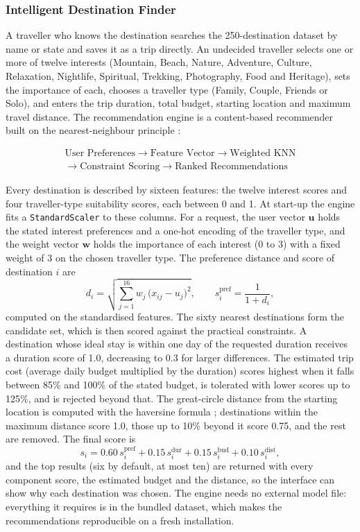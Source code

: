 \subsubsection{Intelligent Destination Finder}

A traveller who knows the destination searches the 250-destination dataset
by name or state and saves it as a trip directly. An undecided traveller
selects one or more of twelve interests (Mountain, Beach, Nature, Adventure,
Culture, Relaxation, Nightlife, Spiritual, Trekking, Photography, Food and
Heritage), sets the importance of each, chooses a traveller type (Family,
Couple, Friends or Solo), and enters the trip duration, total budget,
starting location and maximum travel distance. The recommendation engine is
a content-based recommender \cite{lops2011content} built on the
nearest-neighbour principle \cite{cover1967knn}:

\[
\begin{array}{c}
\text{User Preferences} \rightarrow \text{Feature Vector} \rightarrow
\text{Weighted KNN} \\[2pt]
\rightarrow \text{Constraint Scoring} \rightarrow
\text{Ranked Recommendations}
\end{array}
\]

Every destination is described by sixteen features: the twelve interest
scores and four traveller-type suitability scores, each between 0 and 1. At
start-up the engine fits a \texttt{StandardScaler} to these columns. For a
request, the user vector $\mathbf{u}$ holds the stated interest preferences
and a one-hot encoding of the traveller type, and the weight vector
$\mathbf{w}$ holds the importance of each interest (0 to 3) with a fixed
weight of 3 on the chosen traveller type. The preference distance and score
of destination $i$ are
\[
  d_i = \sqrt{\sum_{j=1}^{16} w_j\,\bigl(x_{ij} - u_j\bigr)^2},
  \qquad
  s^{\mathrm{pref}}_i = \frac{1}{1 + d_i},
\]
computed on the standardised features. The sixty nearest destinations form
the candidate set, which is then scored against the practical constraints. A
destination whose ideal stay is within one day of the requested duration
receives a duration score of 1.0, decreasing to 0.3 for larger differences.
The estimated trip cost (average daily budget multiplied by the duration)
scores highest when it falls between 85\% and 100\% of the stated budget, is
tolerated with lower scores up to 125\%, and is rejected beyond that. The
great-circle distance from the starting location is computed with the
haversine formula \cite{sinnott1984haversine}; destinations within the
maximum distance score 1.0, those up to 10\% beyond it score 0.75, and the
rest are removed. The final score is
\[
  s_i = 0.60\,s^{\mathrm{pref}}_i + 0.15\,s^{\mathrm{dur}}_i
      + 0.15\,s^{\mathrm{bud}}_i + 0.10\,s^{\mathrm{dist}}_i ,
\]
and the top results (six by default, at most ten) are returned with every
component score, the estimated budget and the distance, so the interface can
show why each destination was chosen. The engine needs no external model
file: everything it requires is in the bundled dataset, which makes the
recommendations reproducible on a fresh installation.

